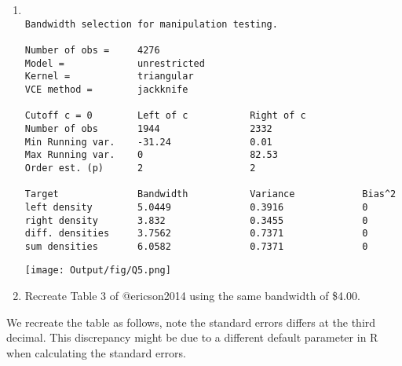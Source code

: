 \documentclass[
  12pt,
]{article}
\begin{document}
\begin{enumerate}
\def\labelenumi{\arabic{enumi}.}
\setcounter{enumi}{4}
\item
\begin{verbatim}

Bandwidth selection for manipulation testing.

Number of obs =     4276
Model =             unrestricted
Kernel =            triangular
VCE method =        jackknife

Cutoff c = 0        Left of c           Right of c          
Number of obs       1944                2332                
Min Running var.    -31.24              0.01                
Max Running var.    0                   82.53               
Order est. (p)      2                   2                   

Target              Bandwidth           Variance            Bias^2              
left density        5.0449              0.3916              0                   
right density       3.832               0.3455              0                   
diff. densities     3.7562              0.7371              0                   
sum densities       6.0582              0.7371              0                   
\end{verbatim}

  \texttt{[image: Output/fig/Q5.png]} \newpage
\item
  Recreate Table 3 of @ericson2014 using the same bandwidth of
  \$4.00.\newline
\end{enumerate}

We recreate the table as follows, note the standard errors differs at
the third decimal. This discrepancy might be due to a different default
parameter in R when calculating the standard errors.
\end{document}
